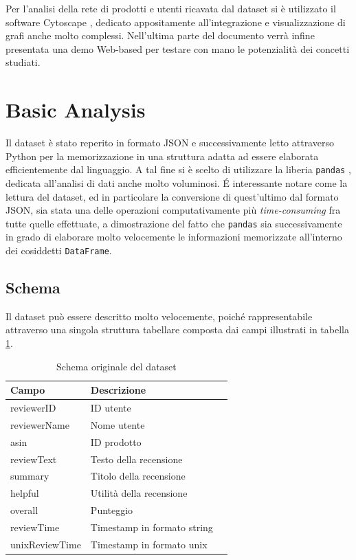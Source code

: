 \documentclass[hidelinks, 12pt]{article}
\begin{document}
Per l'analisi della rete di prodotti e utenti ricavata dal dataset si è utilizzato il software Cytoscape \cite{site:cytoscape}, dedicato appositamente all'integrazione e visualizzazione di grafi anche molto complessi. Nell'ultima parte del documento verrà infine presentata una demo Web-based per testare con mano le potenzialità dei concetti studiati.



\clearpage



\section{Basic Analysis}


Il dataset è stato reperito in formato JSON e successivamente letto attraverso Python per la memorizzazione in una struttura adatta ad essere elaborata efficientemente dal linguaggio. A tal fine si è scelto di utilizzare la liberia \texttt{pandas} \cite{site:pandas}, dedicata all'analisi di dati anche molto voluminosi. É interessante notare come la lettura del dataset, ed in particolare la conversione di quest'ultimo dal formato JSON, sia stata una delle operazioni computativamente più \textit{time-consuming} fra tutte quelle effettuate, a dimostrazione del fatto che \texttt{pandas} sia successivamente in grado di elaborare molto velocemente le informazioni memorizzate all'interno dei cosiddetti \texttt{DataFrame}.



\subsection{Schema}

Il dataset può essere descritto molto velocemente, poiché rappresentabile attraverso una singola struttura tabellare composta dai campi illustrati in tabella \ref{tab:df-schema}.

\begin{table}[H]
	\caption{Schema originale del dataset}\label{tab:df-schema}
	\centering
	\begin{tabular}{|l|l|l|}
		\hline
		Campo & Descrizione \\
		\hline
		reviewerID & ID utente \\
		reviewerName & Nome utente \\
		asin & ID prodotto \\
		reviewText & Testo della recensione \\
		summary & Titolo della recensione \\
		helpful & Utilità della recensione \\
		overall & Punteggio \\
		reviewTime & Timestamp in formato string \\
		unixReviewTime & Timestamp in formato unix \\
		\hline
	\end{tabular}
\end{table}
\end{document}
